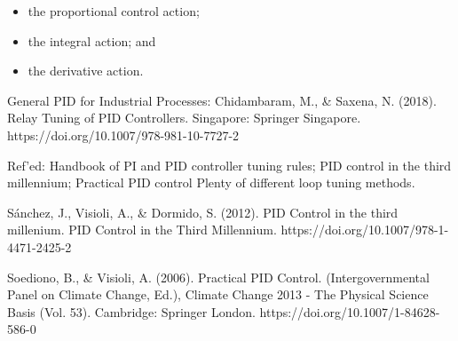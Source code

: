 \documentclass[10pt]{article}
\begin{document}
\begin{itemize}
\item the proportional control action;
\item the integral action; and
\item the derivative action.
\end{itemize}

General PID for Industrial Processes:
\cite{Saxena}
Chidambaram, M., \& Saxena, N. (2018). Relay Tuning of PID Controllers. Singapore: Springer Singapore. https://doi.org/10.1007/978-981-10-7727-2

Ref’ed: Handbook of PI and  PID controller tuning rules; PID control in the third millennium; Practical PID control
Plenty of different loop tuning methods.

\cite{Sanchez2012}
Sánchez, J., Visioli, A., \& Dormido, S. (2012). PID Control in the third millenium. PID Control in the Third Millennium. https://doi.org/10.1007/978-1-4471-2425-2

\cite{Soediono1989}
Soediono, B., \& Visioli, A. (2006). Practical PID Control. (Intergovernmental Panel on Climate Change, Ed.), Climate Change 2013 - The Physical Science Basis (Vol. 53). Cambridge: Springer London. https://doi.org/10.1007/1-84628-586-0


\newpage


\end{document}
